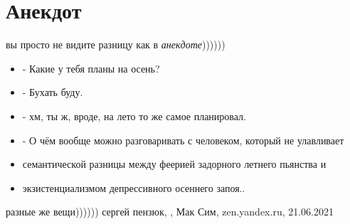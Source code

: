  
 
 
 
 
\chapter{Анекдот}

вы просто не видите разницу
как в \emph{анекдоте}))))))
\begin{itemize}
  \item - Какие у тебя планы на осень?
  \item - Бухать буду.
  \item - хм, ты ж, вроде, на лето то же самое планировал.
  \item - О чём вообще можно разговаривать с человеком, который не улавливает
  \item семантической разницы между феерией задорного летнего пьянства и
  \item экзистенциализмом депрессивного осеннего запоя..
\end{itemize}
разные же вещи))))))
сергей пензюк,
, 
Мак Сим, zen.yandex.ru, 21.06.2021

